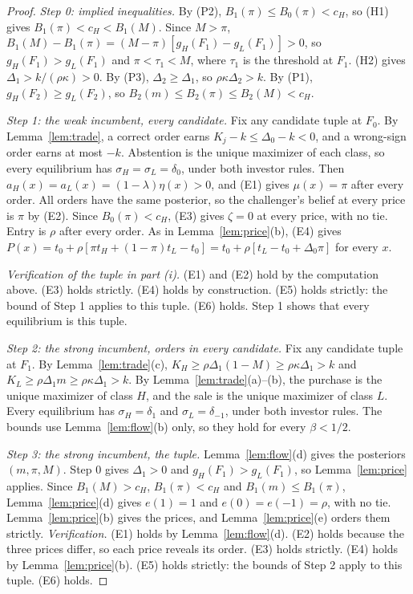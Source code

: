 \documentclass[11pt]{article}
\theoremstyle{definition}
\begin{document}
\begin{proof}
\emph{Step 0: implied inequalities.} By (P2), $B_1(\pi)\le B_0(\pi)<c_H$, so (H1) gives
$B_1(\pi)<c_H<B_1(M)$. Since $M>\pi$, $B_1(M)-B_1(\pi)=(M-\pi)[g_H(F_1)-g_L(F_1)]>0$, so $g_H(F_1)>g_L(F_1)$ and
$\pi<\tau_1<M$, where $\tau_1$ is the threshold at $F_1$. (H2) gives $\Delta_1>k/(\rho\kappa)>0$. By (P3),
$\Delta_2\ge\Delta_1$, so $\rho\kappa\Delta_2>k$. By (P1), $g_H(F_2)\ge g_L(F_2)$, so
$B_2(m)\le B_2(\pi)\le B_2(M)<c_H$.

\emph{Step 1: the weak incumbent, every candidate.} Fix any candidate tuple at $F_0$. By Lemma~\ref{lem:trade},
a correct order earns $K_j-k\le\Delta_0-k<0$, and a wrong-sign order earns at most $-k$. Abstention is the unique
maximizer of each class, so every equilibrium has $\sigma_H=\sigma_L=\delta_0$, under both investor rules.
Then $a_H(x)=a_L(x)=(1-\lambda)\eta(x)>0$, and (E1) gives $\mu(x)=\pi$ after every order. All orders have the
same posterior, so the challenger's belief at every price is $\pi$ by (E2). Since $B_0(\pi)<c_H$, (E3) gives
$\zeta=0$ at every price, with no tie. Entry is $\rho$ after every order. As in Lemma~\ref{lem:price}(b), (E4)
gives $P(x)=t_0+\rho[\pi t_H+(1-\pi)t_L-t_0]=t_0+\rho[t_L-t_0+\Delta_0\pi]$ for every $x$.

\emph{Verification of the tuple in part (i).} (E1) and (E2) hold by the computation above. (E3) holds strictly.
(E4) holds by construction. (E5) holds strictly: the bound of Step 1 applies to this tuple. (E6) holds.
Step 1 shows that every equilibrium is this tuple.

\emph{Step 2: the strong incumbent, orders in every candidate.} Fix any candidate tuple at $F_1$. By
Lemma~\ref{lem:trade}(c), $K_H\ge\rho\Delta_1(1-M)\ge\rho\kappa\Delta_1>k$ and $K_L\ge\rho\Delta_1m\ge\rho\kappa\Delta_1>k$.
By Lemma~\ref{lem:trade}(a)--(b), the purchase is the unique maximizer of class $H$, and the sale is the unique
maximizer of class $L$. Every equilibrium has $\sigma_H=\delta_1$ and $\sigma_L=\delta_{-1}$, under both
investor rules. The bounds use Lemma~\ref{lem:flow}(b) only, so they hold for every $\beta<1/2$.

\emph{Step 3: the strong incumbent, the tuple.} Lemma~\ref{lem:flow}(d) gives the posteriors $(m,\pi,M)$.
Step 0 gives $\Delta_1>0$ and $g_H(F_1)>g_L(F_1)$, so Lemma~\ref{lem:price} applies. Since $B_1(M)>c_H$,
$B_1(\pi)<c_H$ and $B_1(m)\le B_1(\pi)$, Lemma~\ref{lem:price}(d) gives $e(1)=1$ and $e(0)=e(-1)=\rho$, with no
tie. Lemma~\ref{lem:price}(b) gives the prices, and Lemma~\ref{lem:price}(e) orders them strictly.
\emph{Verification.} (E1) holds by Lemma~\ref{lem:flow}(d). (E2) holds because the three prices differ, so each
price reveals its order. (E3) holds strictly. (E4) holds by Lemma~\ref{lem:price}(b). (E5) holds strictly: the
bounds of Step 2 apply to this tuple. (E6) holds.


\end{proof}
\end{document}
